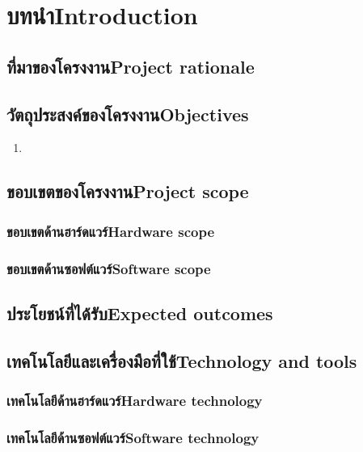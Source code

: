 \chapter{\ifcpe บทนำ\else Introduction\fi}

\section{\ifcpe ที่มาของโครงงาน\else Project rationale\fi}

\section{\ifcpe วัตถุประสงค์ของโครงงาน\else Objectives\fi}
\begin{enumerate}
    \item
\end{enumerate}

\section{\ifcpe ขอบเขตของโครงงาน\else Project scope\fi}

\subsection{\ifcpe ขอบเขตด้านฮาร์ดแวร์\else Hardware scope\fi}

\subsection{\ifcpe ขอบเขตด้านซอฟต์แวร์\else Software scope\fi}

\section{\ifcpe ประโยชน์ที่ได้รับ\else Expected outcomes\fi}

\section{\ifcpe เทคโนโลยีและเครื่องมือที่ใช้\else Technology and tools\fi}

\subsection{\ifcpe เทคโนโลยีด้านฮาร์ดแวร์\else Hardware technology\fi}

\subsection{\ifcpe เทคโนโลยีด้านซอฟต์แวร์\else Software technology\fi}

